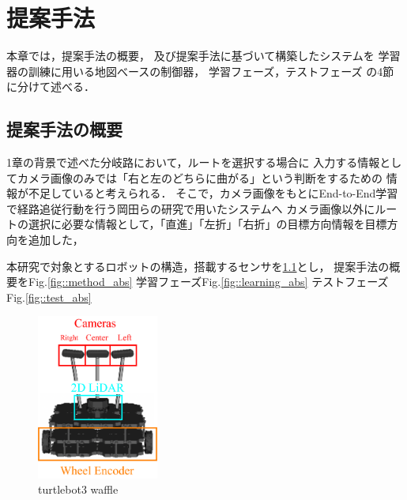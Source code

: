 \chapter{提案手法}\label{chap:method}
本章では，提案手法の概要，
及び提案手法に基づいて構築したシステムを
学習器の訓練に用いる地図べースの制御器，
学習フェーズ，テストフェーズ
の4節に分けて述べる．

\section{提案手法の概要}

1章の背景で述べた分岐路において，ルートを選択する場合に
入力する情報としてカメラ画像のみでは「右と左のどちらに曲がる」という判断をするための
情報が不足していると考えられる．
そこで，カメラ画像をもとにEnd-to-End学習で経路追従行動を行う岡田らの研究\cite{okada}で用いたシステムへ
カメラ画像以外にルートの選択に必要な情報として，「直進」「左折」「右折」の目標方向情報を目標方向を追加した，

本研究で対象とするロボットの構造，搭載するセンサを\ref{fig::turtlebot3_gazo}とし，
提案手法の概要をFig.\ref{fig::method_abs}
学習フェーズFig.\ref{fig::learning_abs}
テストフェーズFig.\ref{fig::test_abs}



\begin{figure}[H]
    \centering
    \includegraphics[width = 4cm]{./figs/turtlebot3_kame.pdf}
    \caption{turtlebot3 waffle}
    \label{fig::turtlebot3_gazo}
\end{figure}




